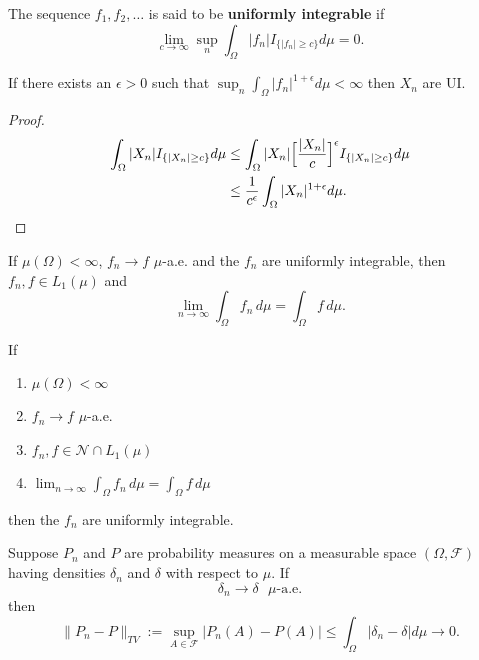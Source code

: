 \begin{definition}
\label{first def of UI}
The sequence $f_1, f_2, \ldots$   is said to be {\bf uniformly integrable} if
\[ \lim_{c \rightarrow \infty} \sup_n \int_\Omega |f_n|I_{\{ |f_n|\geq c\}} d\mu = 0. \]
\end{definition}




\begin{theorem}
If  there exists an $\epsilon>0$ such that $\sup_{n} \int_\Omega |f_n|^{1+\epsilon} d\mu < \infty $
then $X_n$ are UI.
\end{theorem}
\begin{proof}
\begin{align*}
\int_\Omega |X_n| I_{\{|X_n|\geq c\}}  d\mu
&\leq\int_\Omega  |X_n|\Bigl[\frac{|X_n|}{c}\Bigr]^\epsilon I_{\{|X_n|\geq c\}}d\mu \\
&\leq\frac{1}{c^\epsilon}\int_\Omega  |X_n|^{1+\epsilon} d\mu.
\end{align*}
\end{proof}





\begin{theorem}[{\bf UI theorem}]\label{UITHM}
If $\mu(\Omega)<\infty$, $f_n\rightarrow f$ $\mu$-a.e. and  the $f_n$ are uniformly integrable, then $f_n, f\in L_1(\mu)$ and
\[\lim_{n\rightarrow \infty}\int_\Omega f_n \,d\mu = \int_\Omega f\, d\mu.\]
\end{theorem}



\begin{theorem}[{\bf UI converse}]\label{UITHM2}
If
\begin{enumerate}
\item $\mu(\Omega)<\infty$
\item $f_n\rightarrow f$ $\mu$-a.e.
\item $f_n, f \in \mathscr N\cap L_1(\mu)$
\item  $\displaystyle\lim_{n\rightarrow \infty}\int_\Omega f_n \,d\mu = \int_\Omega f\, d\mu$
\end{enumerate}
then the $f_n$ are uniformly integrable.
\end{theorem}



\begin{theorem}
Suppose $P_n$ and $P$ are probability measures on a measurable space $(\Omega, \mathcal F)$ having densities $\delta_n$ and $\delta$ with respect to $\mu$. If
\[ \delta_n\rightarrow \delta\text{ $\mu$-a.e.} \]
then
\[
\| P_n - P\|_{TV}:=
\sup_{A\in \mathcal F}|P_n(A)-P(A)|\leq \int_\Omega |\delta_n - \delta| d\mu \rightarrow 0. \]
\end{theorem}

